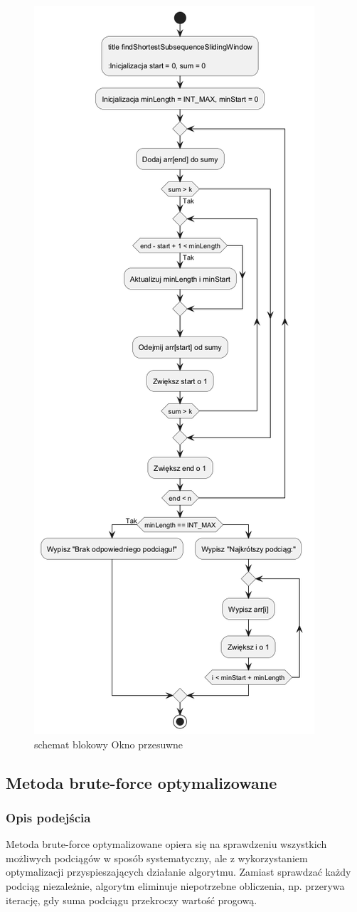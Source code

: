 \documentclass[12pt,twoside]{article}
\begin{document}
\clearpage
\begin{figure}
    \centering
    \includegraphics[width=0.5\linewidth]{schemat2.png}
    \caption{schemat blokowy Okno przesuwne}
    \label{fig:enter-label}
\end{figure}
\clearpage
\subsection{Metoda brute-force optymalizowane}

\subsubsection{Opis podejścia}
Metoda brute-force optymalizowane opiera się na sprawdzeniu wszystkich możliwych podciągów w sposób systematyczny, ale z wykorzystaniem optymalizacji przyspieszających działanie algorytmu. Zamiast sprawdzać każdy podciąg niezależnie, algorytm eliminuje niepotrzebne obliczenia, np. przerywa iterację, gdy suma podciągu przekroczy wartość progową.
\end{document}
